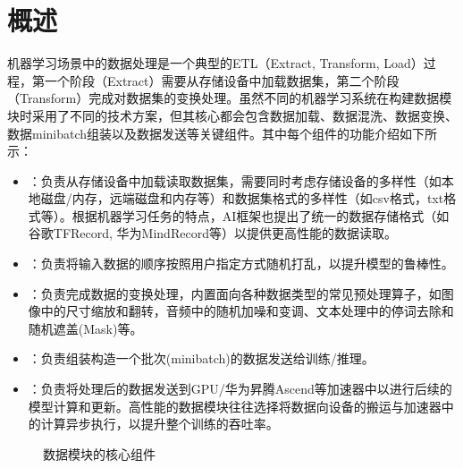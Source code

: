 \documentclass[letterpaper,10pt,english]{sphinxmanual}
\let\sphinxpxdimen\pdfpxdimen\else\newdimen\sphinxpxdimen
\begin{document}
\section{概述}
\label{\detokenize{chapter_data_processing/requirements:id1}}\label{\detokenize{chapter_data_processing/requirements::doc}}
\sphinxAtStartPar
机器学习场景中的数据处理是一个典型的ETL（Extract, Transform,
Load）过程，第一个阶段（Extract）需要从存储设备中加载数据集，第二个阶段（Transform）完成对数据集的变换处理。虽然不同的机器学习系统在构建数据模块时采用了不同的技术方案，但其核心都会包含数据加载、数据混洗、数据变换、数据mini\sphinxhyphen{}batch组装以及数据发送等关键组件。其中每个组件的功能介绍如下所示：
\begin{itemize}
\item {} 
\sphinxAtStartPar
{}：负责从存储设备中加载读取数据集，需要同时考虑存储设备的多样性（如本地磁盘/内存，远端磁盘和内存等）和数据集格式的多样性（如csv格式，txt格式等）。根据机器学习任务的特点，AI框架也提出了统一的数据存储格式（如谷歌TFRecord,
华为MindRecord等）以提供更高性能的数据读取。

\item {} 
\sphinxAtStartPar
{}：负责将输入数据的顺序按照用户指定方式随机打乱，以提升模型的鲁棒性。

\item {} 
\sphinxAtStartPar
{}：负责完成数据的变换处理，内置面向各种数据类型的常见预处理算子，如图像中的尺寸缩放和翻转，音频中的随机加噪和变调、文本处理中的停词去除和随机遮盖(Mask)等。

\item {} 
\sphinxAtStartPar
{}：负责组装构造一个批次(mini\sphinxhyphen{}batch)的数据发送给训练/推理。

\item {} 
\sphinxAtStartPar
{}：负责将处理后的数据发送到GPU/华为昇腾Ascend等加速器中以进行后续的模型计算和更新。高性能的数据模块往往选择将数据向设备的搬运与加速器中的计算异步执行，以提升整个训练的吞吐率。

\end{itemize}

\begin{figure}[H]
\centering
\capstart

\noindent\sphinxincludegraphics[width=800\sphinxpxdimen]{{pipeline}.png}
\caption{数据模块的核心组件}\label{\detokenize{chapter_data_processing/requirements:id5}}\label{\detokenize{chapter_data_processing/requirements:pipeline}}\end{figure}
\end{document}
